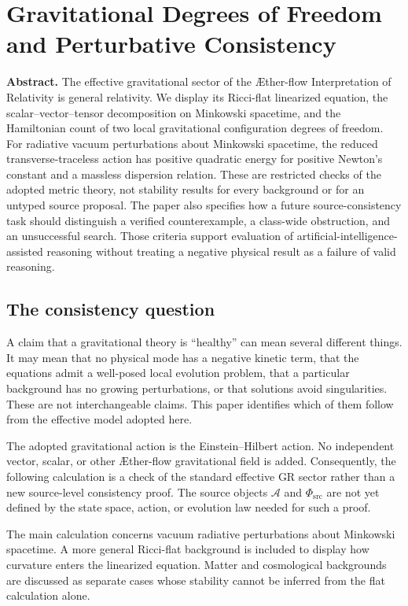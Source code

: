 \documentclass[11pt,oneside]{report}
\newcommand{\ArticleShort}{}
\newcommand{\Aflow}{\AE{}ther-flow}
\newcommand{\Sub}{\mathcal A}
\newcommand{\PhiSrc}{\Phi_{\mathrm{src}}}
\theoremstyle{remark}
\numberwithin{definition}{chapter}
\numberwithin{proposition}{chapter}
\numberwithin{remark}{chapter}
\newcommand{\ChapterAbstract}[1]{%
  \begingroup
  \setlength{\parindent}{0pt}%
  \small\textbf{Abstract.} #1\par
  \endgroup
  \vspace{0.55\baselineskip}%
}
\begin{document}
\clearpage
\renewcommand{\ArticleShort}{Consistency}
\chapter{Gravitational Degrees of Freedom and Perturbative Consistency}
\label{chapter:consistency}
\ChapterAbstract{The effective gravitational sector of the \Aflow{} Interpretation of Relativity is general relativity. We display its Ricci-flat linearized equation, the scalar--vector--tensor decomposition on Minkowski spacetime, and the Hamiltonian count of two local gravitational configuration degrees of freedom. For radiative vacuum perturbations about Minkowski spacetime, the reduced transverse-traceless action has positive quadratic energy for positive Newton's constant and a massless dispersion relation. These are restricted checks of the adopted metric theory, not stability results for every background or for an untyped source proposal. The paper also specifies how a future source-consistency task should distinguish a verified counterexample, a class-wide obstruction, and an unsuccessful search. Those criteria support evaluation of artificial-intelligence-assisted reasoning without treating a negative physical result as a failure of valid reasoning.}

\section{The consistency question}
A claim that a gravitational theory is ``healthy'' can mean several different things. It may mean that no physical mode has a negative kinetic term, that the equations admit a well-posed local evolution problem, that a particular background has no growing perturbations, or that solutions avoid singularities. These are not interchangeable claims. This paper identifies which of them follow from the effective model adopted here.

The adopted gravitational action is the Einstein--Hilbert action. No independent vector, scalar, or other \Aflow{} gravitational field is added. Consequently, the following calculation is a check of the standard effective GR sector rather than a new source-level consistency proof. The source objects $\Sub$ and $\PhiSrc$ are not yet defined by the state space, action, or evolution law needed for such a proof.

The main calculation concerns vacuum radiative perturbations about Minkowski spacetime. A more general Ricci-flat background is included to display how curvature enters the linearized equation. Matter and cosmological backgrounds are discussed as separate cases whose stability cannot be inferred from the flat calculation alone.
\end{document}
